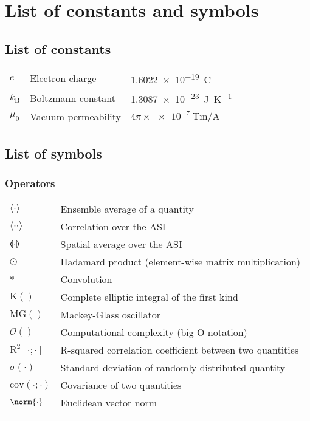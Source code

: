 \chapter{List of constants and symbols}  %
\section*{List of constants}
\begin{longtable}[l]{p{60pt} p{140pt} p{200pt}}
	$e$ & Electron charge & \SI{1.6022e-19}{\coulomb} \\
	$k_\mathrm{B}$ & Boltzmann constant & \SI{1.3087e-23}{\joule\per\kelvin} \\
	$\mu_0$ & Vacuum permeability & $4 \pi \times \SI{e-7}{\tesla\metre\per\ampere}$ \\
\end{longtable}

\section*{List of symbols}
\subsection*{Operators}
\begin{longtable}[l]{p{60pt} p{350pt}}
	$\langle \cdot \rangle$ & Ensemble average of a quantity \\
	$\langle \cdot \cdot \rangle$ & Correlation over the ASI \\
	$\llangle \cdot \rrangle$ & Spatial average over the ASI \\
	$\odot$ & Hadamard product (element-wise matrix multiplication) \\
	$*$ & Convolution \\
	$\mathrm{K}()$ & Complete elliptic integral of the first kind \\
	$\mathrm{MG}()$ & Mackey-Glass oscillator \\
	$\mathcal{O}()$ & Computational complexity (big O notation) \\
	$\mathrm{R}^2[\cdot;\cdot]$ & R-squared correlation coefficient between two quantities \\
	$\sigma( \cdot )$ & Standard deviation of randomly distributed quantity \\
	$\mathrm{cov}(\cdot;\cdot)$ & Covariance of two quantities \\
	$\norm{ \cdot }$ & Euclidean vector norm\\
	&\\
\end{longtable}


